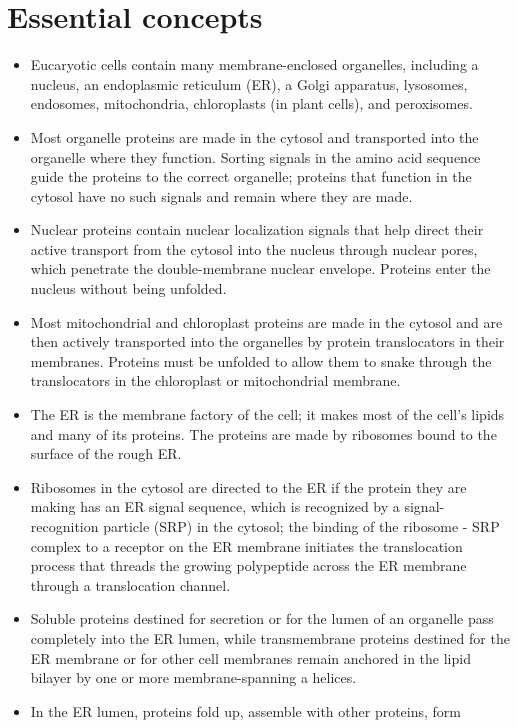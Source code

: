 \section{Essential concepts}

\begin{itemize}
\item Eucaryotic cells contain many membrane-enclosed organelles,
including a nucleus, an endoplasmic reticulum (ER), a Golgi apparatus, 
lysosomes, endosomes, mitochondria, chloroplasts (in plant cells), and peroxisomes.
\item Most organelle proteins are made in the cytosol and transported into
the organelle where they function. Sorting signals in the amino acid
sequence guide the proteins to the correct organelle; proteins that
function in the cytosol have no such signals and remain where they
are made.
\item Nuclear proteins contain nuclear localization signals that help direct
their active transport from the cytosol into the nucleus through
nuclear pores, which penetrate the double-membrane nuclear envelope. 
Proteins enter the nucleus without being unfolded.
\item Most mitochondrial and chloroplast proteins are made in the cytosol
and are then actively transported into the organelles by protein
translocators in their membranes. Proteins must be unfolded to allow
them to snake through the translocators in the chloroplast or mitochondrial membrane.
\item The ER is the membrane factory of the cell; it makes most of the cell’s
lipids and many of its proteins. The proteins are made by ribosomes
bound to the surface of the rough ER.
\item Ribosomes in the cytosol are directed to the ER if the protein they
are making has an ER signal sequence, which is recognized by a
signal-recognition particle (SRP) in the cytosol; the binding of the
ribosome - SRP complex to a receptor on the ER membrane initiates 
the translocation process that threads the growing polypeptide
across the ER membrane through a translocation channel.
\item Soluble proteins destined for secretion or for the lumen of an organelle
pass completely into the ER lumen, while transmembrane proteins
destined for the ER membrane or for other cell membranes remain
anchored in the lipid bilayer by one or more membrane-spanning a
helices.
\item In the ER lumen, proteins fold up, assemble with other proteins, form

\end{itemize}
